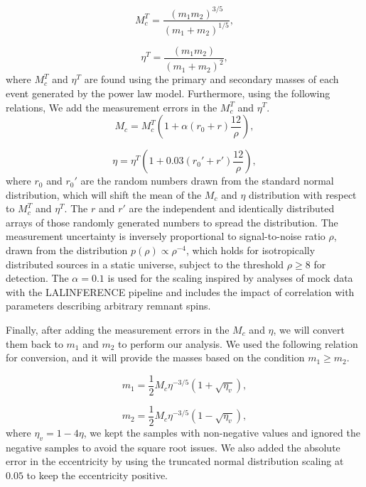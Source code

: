 \documentclass[twocolumn,prd,nofootinbib]{revtex4}
\begin{document}
\begin{equation}
    M_c^T = \frac{(m_1 m_2)^{3/5}}{(m_1+m_2)^{1/5}},
\end{equation}

\begin{equation}
    \eta^T = \frac{(m_1 m_2)}{(m_1+m_2)^2},
\end{equation}
where $M_c^T$ and $\eta^T$ are found using the primary and secondary masses of each event generated by the power law model.
Furthermore, using the following relations, We add the measurement errors in the $M_c^T$ and $\eta^T$.
\begin{equation}
    M_c = M_c^T\left( 1+\alpha (r_0+r ) \frac{12}{\rho}\right),
\end{equation}

\begin{equation}
\eta = \eta^T\left( 1+0.03 (r_0'+r') \frac{12}{\rho}\right),   
\end{equation}
where $r_0$ and $r_0'$ are the random numbers drawn from the standard normal distribution, which will shift the mean of the $M_c$ and $\eta$ distribution with respect to $M_c^T$ and $\eta^T$. The $r$ and $r'$ are the independent and identically distributed arrays of those randomly generated numbers to spread the distribution. The measurement uncertainty is inversely proportional to signal-to-noise ratio $\rho$, drawn from the distribution $p(\rho) \propto \rho^{-4}$, which holds for isotropically distributed sources in a static universe, subject to the threshold $\rho\geq 8$ for detection. The $\alpha =0.1$ is used for the scaling inspired by analyses of mock data with the LALINFERENCE pipeline \cite{alpha_error_2015} and includes the impact of correlation with parameters describing arbitrary remnant spins.

Finally, after adding the measurement errors in the $M_c$ and $\eta$, we will convert them back to $m_1$ and $m_2$ to perform our analysis. We used the following relation for conversion, and it will provide the masses based on the condition $m_1\geq m_2$.

\begin{equation}
    m_1 = \frac{1}{2} M_c \eta^{-3/5} (1+\sqrt{\eta_v}),
\end{equation}

\begin{equation}
    m_2 = \frac{1}{2} M_c \eta^{-3/5} (1-\sqrt{\eta_v}), 
\end{equation}
where $\eta_v = 1-4\eta$, we kept the samples with non-negative values and ignored the negative samples to avoid the square root issues. We also added the absolute error in the eccentricity by using the truncated normal distribution scaling at $0.05$ to keep the eccentricity positive.
\end{document}
